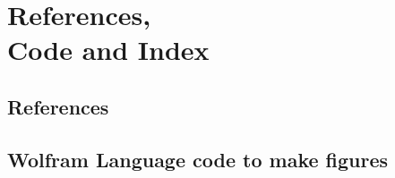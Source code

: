 \documentclass[11pt,fleqn]{book} %
\begin{document}


\part[References, Code and Index]{\texorpdfstring{References, \\ Code and Index}{References, Code and Index}}
\chapter*{References}
\printbibliography[heading=bibempty]

\cleardoublepage
{}
\chapter*{Wolfram Language code to make figures}
\end{document}

